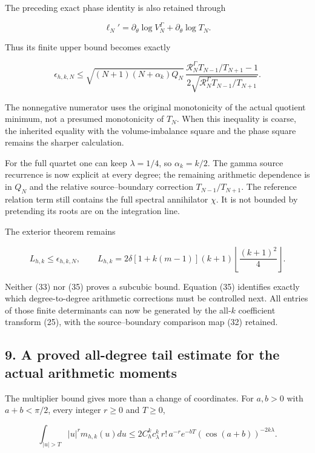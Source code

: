 The preceding exact phase identity is also retained through

\[
\ell_N'=\partial_\theta\log V_N^\Gamma+\partial_\theta\log T_N.
\]

Thus its finite upper bound becomes exactly

\[
\boxed{
\epsilon_{h,k,N}\le
\sqrt{(N+1)(N+\alpha_k)Q_N}\,
\frac{\mathcal R_N^\Gamma T_{N-1}/T_{N+1}-1}
 {2\sqrt{\mathcal R_N^\Gamma T_{N-1}/T_{N+1}}}.
}                                                                   \tag{35}
\]

The nonnegative numerator uses the original monotonicity of the actual quotient minimum, not a
presumed monotonicity of \(T_N\). When this inequality is coarse, the inherited equality with the
volume-imbalance square and the phase square remains the sharper calculation.

For the full quartet one can keep \(\lambda=1/4\), so \(\alpha_k=k/2\). The gamma source recurrence
is now explicit at every degree; the remaining arithmetic dependence is in \(Q_N\) and the relative
source--boundary correction \(T_{N-1}/T_{N+1}\). The reference relation term still contains the full
spectral annihilator \(\chi\). It is not bounded by pretending its roots are on the integration
line.

The exterior theorem remains

\[
L_{h,k}\le\epsilon_{h,k,N},\qquad
L_{h,k}=2\delta[1+k(m-1)](k+1)
          \left\lfloor\frac{(k+1)^2}{4}\right\rfloor.
\]

Neither (33) nor (35) proves a subcubic bound. Equation (35) identifies exactly which
degree-to-degree arithmetic corrections must be controlled next. All entries of those finite
determinants can now be generated by the all-\(k\) coefficient transform (25), with the
source--boundary comparison map (32) retained.

\subsection{9. A proved all-degree tail estimate for the actual arithmetic
moments}\label{gamma_convolution:a-proved-all-degree-tail-estimate-for-the-actual-arithmetic-moments}

The multiplier bound gives more than a change of coordinates. For \(a,b>0\) with \(a+b<\pi/2\),
every integer \(r\ge0\) and \(T\ge0\),

\[
\boxed{
\int_{|u|>T}|u|^r m_{h,k}(u)du
\le
2 C_h^k c_\lambda^k\,r!\,a^{-r}
 e^{-bT}(\cos(a+b))^{-2k\lambda}.
}                                                                   \tag{36}
\]


